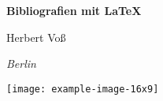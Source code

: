 \documentclass[paper=b5]{scrbook}
\begin{document}
\begin{titlepage}
	\setlength{\parindent}{0pt}
{
\centering 
{\fontsize{32pt}{36pt}\selectfont\bfseries Bibliografien mit \LaTeX\par}
\vspace{.2\textheight}
{\Large Herbert Voß\par}
{\small\itshape Berlin\par}
}
\vfill
\Large\dantelogo\hfill\texttt{[image: example-image-16x9]}
\end{titlepage}
\end{document}

